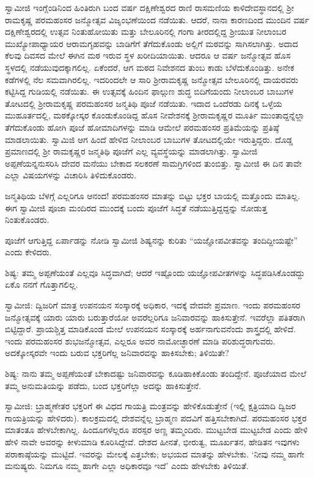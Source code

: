 ಸ್ವಾಮೀಜಿ ಇಂಗ್ಲೆಂಡಿನಿಂದ ಹಿಂತಿರುಗಿ ಬಂದ ವರ್ಷ ದಕ್ಷಿಣೇಶ್ವರದ ರಾಣಿ ರಾಸಮಣಿಯ ಕಾಳಿದೇವಸ್ಥಾನದಲ್ಲಿ ಶ‍್ರೀ ರಾಮಕೃಷ್ಣ ಪರಮಹಂಸರ ಜನ್ಮೋತ್ಸವ ವಿಜೃಂಭಣೆಯಿಂದ ನಡೆಯಿತು. ಆದರೆ, ನಾನಾ ಕಾರಣದಿಂದ ಮುಂದಿನ ವರ್ಷ ದಕ್ಷಿಣೇಶ್ವರದಲ್ಲಿ ಉತ್ಸವ ನಿಂತುಹೋಯಿತು ಮತ್ತು ಬೇಲೂರಿನಲ್ಲಿ ಗಂಗಾ ತೀರದಲ್ಲಿದ್ದ ಶ‍್ರೀಯುತ ನೀಲಾಂಬರ ಮುಖ್ಯೋಪಾಧ್ಯಾಯರ ಆರಾಮಗೃಹವನ್ನು ಬಾಡಿಗೆಗೆ ತೆಗೆದುಕೊಂಡು ಅಲ್ಲಿಗೆ ಮಠವನ್ನು ಸಾಗಿಸಲಾಗಿತ್ತು. ಅದಾದ ಕೆಲವು ದಿವಸದ ಮೇಲೆ ಈಗಿನ ಮಠ ಇರುವ ಸ್ಥಳ ಖರೀದಿಯಾಯಿತು. ಆದರೂ ಆ ವರ್ಷ ಜನ್ಮೋತ್ಸವ ಹೊಸ ಸ್ಥಳದಲ್ಲಿ ನಡೆಯುವುದಕ್ಕಾಗಲಿಲ್ಲ. ಏಕೆಂದರೆ, ಆಗ ಮಠದ ನಿವೇಶನದ ತುಂಬ ಕಾಡು ಬೆಳೆದುಕೊಂಡಿತ್ತು. ಅನೇಕ ಕಡೆಗಳಲ್ಲಿ ನೆಲ ಸಮವಾಗಿರಲಿಲ್ಲ. ಇದರಿಂದಲೇ ಆ ಸಾರಿ ಶ‍್ರೀರಾಮಕೃಷ್ಣ ಜನ್ಮೋತ್ಸವ ಬೇಲೂರಿನಲ್ಲಿ ದಾಯರವರು ಕಟ್ಟಿಸಿದ್ದ ಗುಡಿಯಲ್ಲಿ ನಡೆಯಿತು. ಈ ಉತ್ಸವಕ್ಕೆ ಹಿಂದಿನ ಫಾಲ್ಗುಣ ಶುದ್ಧ ಬಿದಿಗೆಯಂದು ನೀಲಾಂಬರ ಬಾಬುಗಳ ತೋಟದಲ್ಲಿ ಶ‍್ರೀರಾಮಕೃಷ್ಣ ಪರಮಹಂಸರ ಜನ್ಮತಿಥಿ ಪೂಜೆ ನಡೆಯಿತು. ಇದಾದ ಒಂದೆರಡು ದಿನಕ್ಕೆ ಒಳ್ಳೆಯ ಮುಹೂರ್ತದಲ್ಲಿ, ಮಠಕ್ಕೋಸ್ಕರ ಕೊಂಡುಕೊಂಡಿದ್ದ ಹೊಸ ನೀವೇಶನಕ್ಕೆ ಶ‍್ರೀರಾಮಕೃಷ್ಣರ ಮೂರ್ತಿ ಮುಂತಾದ್ದನ್ನೆಲ್ಲಾ ತೆಗೆದುಕೊಂಡು ಹೋಗಿ ಪೂಜೆ ಹೋಮಾದಿಗಳನ್ನು ಮಾಡಿ ಆಮೇಲೆ ಪರಮಹಂಸರ ಪ್ರತಿಮೆಯನ್ನು ಪ್ರತಿಷ್ಠೆ ಮಾಡಲಾಯಿತು. ಸ್ವಾಮಿಜಿ ಆಗ ಹಿಂದೆ ಹೇಳಿದ ನೀಲಾಂಬರ ಬಾಬುಗಳ ತೋಟದಲ್ಲಿಯೇ ಇರುತ್ತಿದ್ದರು. ದೊಡ್ಡ ಪ್ರಮಾಣದಲ್ಲಿ ಶ‍್ರೀ ರಾಮಕೃಷ್ಣರ ಜನ್ಮತಿಥಿ ಪೂಜೆಗೆ ಎಲ್ಲ ವ್ಯವಸ್ಥೆಯನ್ನು ಮಾಡಲಾಗಿತ್ತು. ಸ್ವಾಮೀಜಿ ಅಪ್ಪಣೆಯನ್ನನುಸರಿಸಿ ದೇವರ ಮನೆಯು ಬೇಕಾದ ಸಲಕರಣೆ ಸಾಮಗ್ರಿಗಳಿಂದ ತುಂಬಿತ್ತು. ಸ್ವಾಮೀಜಿ ಈ ದಿನ ತಾವೇ ಎಲ್ಲಾ ವಿಷಯಗಳನ್ನು ವಿಚಾರಿಸಿ ತಿಳಿದುಕೊಂಡರು.

ಜನ್ಮತಿಥಿಯ ಬೆಳಗ್ಗೆ ಎಲ್ಲರಿಗೂ ಆನಂದ! ಪರಮಹಂಸರ ಮಾತನ್ನು ಬಿಟ್ಟು ಭಕ್ತರ ಬಾಯಲ್ಲಿ ಮತ್ತೊಂದು ಮಾತಿಲ್ಲ. ಈಗ ಸ್ವಾಮೀಜಿ ಪೂಜಾ ಮಂದಿರದ ಮುಂದಕ್ಕೆ ಬಂದು ಪೂಜೆಗೆ ಸಿದ್ಧತೆ ನಡೆಯುತ್ತಿದ್ದದ್ದನ್ನು ನೋಡುತ್ತ ನಿಂತುಕೊಂಡರು.

ಪೂಜೆಗೆ ಆಗುತ್ತಿದ್ದ ಏರ್ಪಾಡನ್ನು ನೋಡಿ ಸ್ವಾಮೀಜಿ ಶಿಷ್ಯನನ್ನು ಕುರಿತು “ಯಜ್ಞೋಪವೀತವನ್ನು ತಂದಿದ್ದೀಯಷ್ಟೇ” ಎಂದು ಕೇಳಿದರು.

ಶಿಷ್ಯ: ತಮ್ಮ ಅಪ್ಪಣೆಯಂತೆ ಎಲ್ಲವೂ ಸಿದ್ಧವಾಗಿದೆ; ಆದರೆ ಇಷ್ಟೊಂದು ಯಜ್ಞೋಪವೀತಗಳನ್ನು ಸಿದ್ಧಪಡಿಸಿಕೊಂಡದ್ದು ಏಕೊ ನನಗೆ ಗೊತ್ತಾಗಲಿಲ್ಲ.

ಸ್ವಾಮೀಜಿ: ದ್ವಿಜರಿಗೆ ಮಾತ್ರ ಉಪನಯನ ಸಂಸ್ಕಾರಕ್ಕೆ ಅಧಿಕಾರ, ಇದಕ್ಕೆ ವೇದವೇ ಪ್ರಮಾಣ. ಇಂದು ಪರಮಹಂಸರ ಜನ್ಮೋತ್ಸವಕ್ಕೆ ಯಾರು ಯಾರು ಬರುತ್ತಾರೆಯೋ ಅವರೆಲ್ಲರಿಗೂ ಜನಿವಾರವನ್ನು ಹಾಕಿಸುತ್ತೇನೆ. ಇವರೆಲ್ಲಾ ಪತಿತರಾಗಿ ಬಿಟ್ಟಿದ್ದಾರೆ. ಪ್ರಾಯಶ್ಚಿತ್ತ ಮಾಡಿಕೊಂಡ ಮೇಲೆ ಉಪನಯನ ಸಂಸ್ಕಾರಕ್ಕೆ ಅರ್ಹನಾಗುವನೆಂದು ಶಾಸ್ತ್ರದಲ್ಲಿ ಹೇಳಿದೆ. ಇಂದು ಪರಮಹಂಸರ ಶುಭಜನ್ಮೋತ್ಸವ, ಎಲ್ಲರೂ ಅವರ ನಾಮೋಚ್ಛಾರಣೆ ಮಾಡಿ ಪರಿಶುದ್ಧರಾಗುವರು. ಅದಕ್ಕೋಸ್ಕರವೇ ಇಂದು ಬರುವ ಭಕ್ತರಿಗೆಲ್ಲ ಜನಿವಾರವನ್ನು ಹಾಕಿಸಬೇಕು; ತಿಳಿಯಿತೇ?

ಶಿಷ್ಯ: ನಾನು ತಮ್ಮ ಅಪ್ಪಣೆಯಂತೆ ಬೇಕಾದಷ್ಟು ಜನಿವಾರವನ್ನು ಕೂಡಿಹಾಕಿಕೊಂಡು ತಂದಿದ್ದೇನೆ. ಪೂಜೆಯಾದ ಮೇಲೆ ತಮ್ಮ ಅನುಮತಿಯನ್ನು ಪಡೆದು, ಬಂದ ಭಕ್ತರಿಗೆಲ್ಲಾ ಅದನ್ನು ಹಾಕಿಸುತ್ತೇನೆ.

ಸ್ವಾಮೀಜಿ: ಬ್ರಾಹ್ಮಣೇತರ ಭಕ್ತರಿಗೆ ಈ ವಿಧದ ಗಾಯತ್ರಿ ಮಂತ್ರವನ್ನು ಹೇಳಿಕೊಡುತ್ತೇನೆ (ಇಲ್ಲಿ ಕ್ಷತ್ರಿಯಾದಿ ದ್ವಿಜರ ಗಾಯತ್ರಿಯನ್ನು ಹೇಳಿದರು). ಕಾಲಕ್ರಮದಲ್ಲಿ ದೇಶವನ್ನೆಲ್ಲ ಬ್ರಾಹ್ಮಣ ಪದವಿಗೆ ಹತ್ತಿಸಬೇಕಾಗಿದೆ. ಪರಮಹಂಸರ ಭಕ್ತರ ಮಾತಂತೂ ಹೇಳಬೇಕಾಗಿಲ್ಲ. ಹಿಂದೂಗಳೆಲ್ಲರೂ ಪರಸ್ಪರ ಅಣ್ಣ ತಮ್ಮಂದಿರು. ಮುಟ್ಟಬೇಡ ಮುಟ್ಟಬೇಡ ಎಂದು ಹೇಳಿ ಹೇಳಿ ನಾವೇ ಅವರನ್ನು ಕೀಳುಮಾಡಿ ಕೂರಿಸಿದ್ದೇವೆ. ದೇಶದ ಹೀನತೆ, ಭೀರುತ್ವ, ಮೂರ್ಖತನ, ಹೇಡಿತನ ಇವುಗಳು ಪರಾಕಾಷ್ಠೆಯನ್ನು ಮುಟ್ಟಿದೆ. ಇವರನ್ನು ಮೇಲಕ್ಕೆ ಎತ್ತಬೇಕು; ಅಭಯದ ಮಾತನ್ನು ಹೇಳಬೇಕು. ‘ನೀವು ನಮ್ಮ ಹಾಗೇ ಮನುಷ್ಯರು. ನಿಮಗೂ ನಮ್ಮ ಹಾಗೇ ಎಲ್ಲಾ ಅಧಿಕಾರವೂ ಇದೆ’ ಎಂದು ಹೇಳಬೇಕು ತಿಳಿಯಿತೆ.

